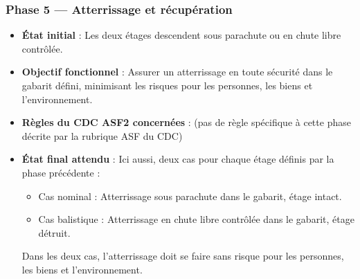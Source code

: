 \subsubsection*{Phase 5 — Atterrissage et récupération}
\begin{itemize}
    \item \textbf{État initial} : Les deux étages descendent sous parachute ou en chute libre contrôlée.
    \item \textbf{Objectif fonctionnel} : Assurer un atterrissage en toute sécurité dans le gabarit défini, minimisant les
    risques pour les personnes, les biens et l’environnement.
    \item \textbf{Règles du \acrshort{CDC} ASF2 concernées} : (pas de règle spécifique à cette phase décrite par la rubrique ASF
    du \acrshort{CDC})
    \item \textbf{État final attendu} : Ici aussi, deux cas pour chaque étage définis par la phase précédente :
    \begin{itemize}
        \item Cas nominal : Atterrissage sous parachute dans le gabarit, étage intact.
        \item Cas balistique : Atterrissage en chute libre contrôlée dans le gabarit, étage détruit.
    \end{itemize}
    Dans les deux cas, l’atterrissage doit se faire sans risque pour les personnes, les biens et l’environnement.
\end{itemize}

\newpage
